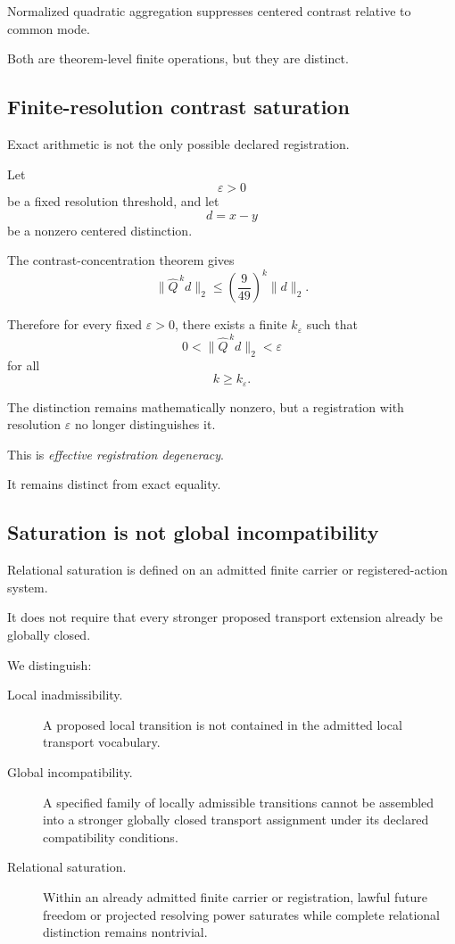 Normalized quadratic aggregation suppresses centered contrast relative
to common mode.

Both are theorem-level finite operations, but they are distinct.

\subsection{Finite-resolution contrast saturation}

Exact arithmetic is not the only possible declared registration.

Let
\[
\varepsilon>0
\]
be a fixed resolution threshold, and let
\[
d=x-y
\]
be a nonzero centered distinction.

The contrast-concentration theorem gives
\[
\|\widehat Q^{\,k}d\|_2
\le
\left(\frac9{49}\right)^k
\|d\|_2.
\]

Therefore for every fixed \(\varepsilon>0\), there exists a finite
\(k_\varepsilon\) such that
\[
0<
\|\widehat Q^{\,k}d\|_2
<
\varepsilon
\]
for all
\[
k\ge k_\varepsilon.
\]

The distinction remains mathematically nonzero, but a registration
with resolution \(\varepsilon\) no longer distinguishes it.

This is
\emph{effective registration degeneracy}.

It remains distinct from exact equality.

\subsection{Saturation is not global incompatibility}

Relational saturation is defined on an admitted finite carrier or
registered-action system.

It does not require that every stronger proposed transport extension
already be globally closed.

We distinguish:

\begin{description}

\item[Local inadmissibility.]
A proposed local transition is not contained in the admitted local
transport vocabulary.

\item[Global incompatibility.]
A specified family of locally admissible transitions cannot be
assembled into a stronger globally closed transport assignment under
its declared compatibility conditions.

\item[Relational saturation.]
Within an already admitted finite carrier or registration, lawful
future freedom or projected resolving power saturates while complete
relational distinction remains nontrivial.

\end{description}

